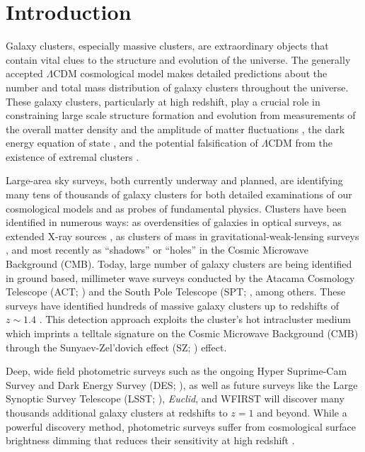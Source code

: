 \documentclass[apj, revtex4-1]{emulateapj}
\newcommand{\editorial}[1]{\textcolor{red}{#1}}
\begin{document}
\section{Introduction}
Galaxy clusters, especially massive clusters, are extraordinary objects that contain vital clues to the structure and evolution of the universe. The generally accepted $\Lambda$CDM cosmological model makes detailed predictions about the number and total mass distribution of galaxy clusters throughout the universe. These galaxy clusters, particularly at high redshift, play a crucial role in constraining large scale structure formation and evolution from measurements of the overall matter density and the amplitude of matter fluctuations , the dark energy equation of state , and the potential falsification of $\Lambda$CDM from the existence of  extremal clusters .

Large-area sky surveys, both currently underway and planned, are identifying many tens of thousands of galaxy clusters for both detailed examinations of our cosmological models and as probes of fundamental physics. Clusters have been identified in numerous ways: as overdensities of galaxies in optical surveys, as extended X-ray sources , as clusters of mass in gravitational-weak-lensing surveys , and most recently as ``shadows'' or ``holes'' in the Cosmic Microwave Background (CMB).  Today, large number of galaxy clusters are being identified in ground based, millimeter wave surveys conducted by the Atacama Cosmology Telescope (ACT; \citealt{Swetz2011}) and the South Pole Telescope (SPT; \citealt{Carlstrom2011}, among others. These surveys have identified hundreds of massive galaxy clusters up to redshifts of $z \sim 1.4$ . This detection approach exploits the cluster's hot intracluster medium which imprints a telltale signature on the Cosmic Microwave Background (CMB) through the Sunyaev-Zel'dovich effect (SZ; \citealt{Sunyaev1972}) effect.

Deep, wide field photometric surveys such as the ongoing Hyper Suprime-Cam Survey \citep{Aihara2018a} and Dark Energy Survey (DES; \citealt{DES2005}), as well as future surveys like the Large Synoptic Survey Telescope (LSST; \citealt{LSST2012}), \textit{Euclid}, and WFIRST will discover many thousands additional galaxy clusters at redshifts to $z=1$  and beyond. While a powerful discovery method, photometric surveys suffer from cosmological surface brightness dimming that reduces their sensitivity at high redshift .
\end{document}
